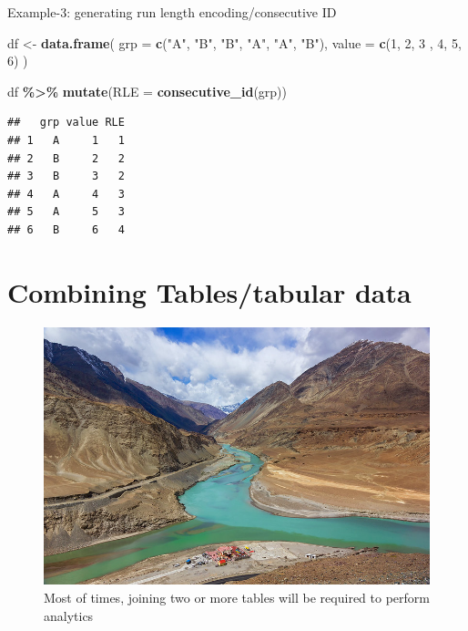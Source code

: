 \documentclass[
]{book}
\newenvironment{Shaded}{\begin{snugshade}}{\end{snugshade}}
\newcommand{\AttributeTok}[1]{\textcolor[rgb]{0.13,0.29,0.53}{#1}}
\newcommand{\DecValTok}[1]{\textcolor[rgb]{0.00,0.00,0.81}{#1}}
\newcommand{\FunctionTok}[1]{\textcolor[rgb]{0.13,0.29,0.53}{\textbf{#1}}}
\newcommand{\NormalTok}[1]{#1}
\newcommand{\OtherTok}[1]{\textcolor[rgb]{0.56,0.35,0.01}{#1}}
\newcommand{\SpecialCharTok}[1]{\textcolor[rgb]{0.81,0.36,0.00}{\textbf{#1}}}
\newcommand{\StringTok}[1]{\textcolor[rgb]{0.31,0.60,0.02}{#1}}
\begin{document}
Example-3: generating run length encoding/consecutive ID

\begin{Shaded}
\begin{Highlighting}[]
\NormalTok{df }\OtherTok{\textless{}{-}} \FunctionTok{data.frame}\NormalTok{(}
  \AttributeTok{grp =} \FunctionTok{c}\NormalTok{(}\StringTok{"A"}\NormalTok{, }\StringTok{"B"}\NormalTok{, }\StringTok{"B"}\NormalTok{, }\StringTok{"A"}\NormalTok{, }\StringTok{"A"}\NormalTok{, }\StringTok{"B"}\NormalTok{),}
  \AttributeTok{value =} \FunctionTok{c}\NormalTok{(}\DecValTok{1}\NormalTok{, }\DecValTok{2}\NormalTok{, }\DecValTok{3}\NormalTok{ , }\DecValTok{4}\NormalTok{, }\DecValTok{5}\NormalTok{, }\DecValTok{6}\NormalTok{)}
\NormalTok{)}

\NormalTok{df }\SpecialCharTok{\%\textgreater{}\%} 
  \FunctionTok{mutate}\NormalTok{(}\AttributeTok{RLE =} \FunctionTok{consecutive\_id}\NormalTok{(grp))}
\end{Highlighting}
\end{Shaded}

\begin{verbatim}
##   grp value RLE
## 1   A     1   1
## 2   B     2   2
## 3   B     3   2
## 4   A     4   3
## 5   A     5   3
## 6   B     6   4
\end{verbatim}

\hypertarget{combining-tablestabular-data}{%
\chapter{Combining Tables/tabular data}\label{combining-tablestabular-data}}

\begin{figure}

{\centering \includegraphics[width=0.75\linewidth,height=0.75\textheight]{images/conf} 

}

\caption{Most of times, joining two or more tables will be required to perform analytics}\label{fig:unnamed-chunk-287}
\end{figure}
\end{document}

